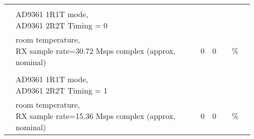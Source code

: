 \documentclass{article}
\begin{document}
\begin{landscape}
\begin{scriptsize}
\begin{longtable}{|c|l|c|c|c|c|l|}
                          &                                      &                                & &                                &                      & \\
                          & \multirow{2}{*}{\parbox{9.5 cm}{\hspace*{12mm}AD9361 1R1T mode, \\ \hspace*{12mm}AD9361 2R2T Timing = 0}} & & & & & \\
                          &                                      &                                & &                                &                      & \\
                          & \multirow{2}{*}{\parbox{9.5cm}{\hspace*{15mm}room temperature, \\ \hspace*{15mm}RX sample rate=30.72 Msps complex (approx, nominal)}} & \multirow{2}{*}{0} & \multirow{2}{*}{0} & & \multirow{2}{*}{\%} & \\
                          &                                      &                                & &                                &                      & \\
                          &                                      &                                & &                                &                      & \\
                          & \multirow{2}{*}{\parbox{9.5 cm}{\hspace*{12mm}AD9361 1R1T mode, \\ \hspace*{12mm}AD9361 2R2T Timing = 1}} & & & & & \\
                          &                                      &                                & &                                &                      & \\
                          & \multirow{2}{*}{\parbox{9.5cm}{\hspace*{15mm}room temperature, \\ \hspace*{15mm}RX sample rate=15.36 Msps complex (approx, nominal)}} & \multirow{2}{*}{0} & \multirow{2}{*}{0} & & \multirow{2}{*}{\%} & \\
                          &                                      &                                & &                                &                      & \\
			  \hline
	\end{longtable}
\end{scriptsize}
\end{landscape}
\end{document}
